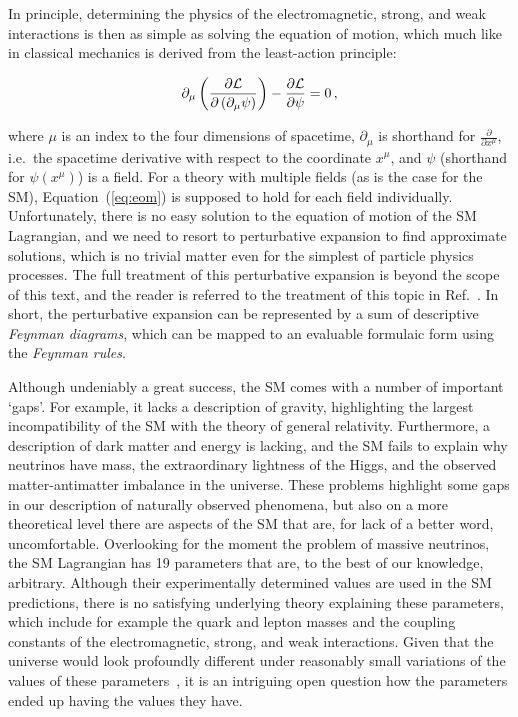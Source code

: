 In principle, determining the physics of the electromagnetic, strong, and weak interactions is then as simple as solving the equation of motion, which much like in classical mechanics is derived from the least-action principle:
% 
\begin{linenomath*}
\begin{equation}
\label{eq:eom}
\partial_\mu \left(
    \frac{
        \partial \mathcal{L}
        }{
        \partial \left( \partial_\mu \psi \right)
        }
    \right)
    -
    \frac{\partial\mathcal{L}}{\partial\psi}
    = 0
\,,
\end{equation}
\end{linenomath*}
% 
where $\mu$ is an index to the four dimensions of spacetime, $\partial_\mu$ is shorthand for $\frac{\partial}{\partial x^\mu}$, i.e.\ the spacetime derivative with respect to the coordinate $x^\mu$, and $\psi$ (shorthand for $\psi(x^\mu)$) is a field.
% 
For a theory with multiple fields (as is the case for the SM), Equation~(\ref{eq:eom}) is supposed to hold for each field individually.
% 
Unfortunately, there is no easy solution to the equation of motion of the SM Lagrangian, and we need to resort to perturbative expansion to find approximate solutions, which is no trivial matter even for the simplest of particle physics processes.
% 
The full treatment of this perturbative expansion is beyond the scope of this text, and the reader is referred to the treatment of this topic in Ref.~\cite{peskin}.
% 
In short, the perturbative expansion can be represented by a sum of descriptive \textit{Feynman diagrams}, which can be mapped to an evaluable formulaic form using the \textit{Feynman rules}.


Although undeniably a great success, the SM comes with a number of important `gaps'.
% 
For example, it lacks a description of gravity, highlighting the largest incompatibility of the SM with the theory of general relativity.
% 
Furthermore, a description of dark matter and energy is lacking, and the SM fails to explain why neutrinos have mass, the extraordinary lightness of the Higgs, and the observed matter-antimatter imbalance in the universe.
% 
These problems highlight some gaps in our description of naturally observed phenomena, but also on a more theoretical level there are aspects of the SM that are, for lack of a better word, uncomfortable.
% 
Overlooking for the moment the problem of massive neutrinos, the SM Lagrangian has 19 parameters that are, to the best of our knowledge, arbitrary.
% 
Although their experimentally determined values are used in the SM predictions, there is no satisfying underlying theory explaining these parameters, which include for example the quark and lepton masses and the coupling constants of the electromagnetic, strong, and weak interactions.
% 
Given that the universe would look profoundly different under reasonably small variations of the values of these parameters~\cite{Cahn:1996ag}, it is an intriguing open question how the parameters ended up having the values they have.
% 


